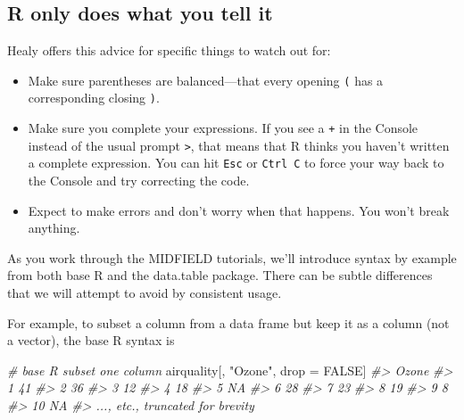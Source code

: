 \documentclass[
]{book}
\newenvironment{Shaded}{\begin{snugshade}}{\end{snugshade}}
\newcommand{\CommentTok}[1]{\textcolor[rgb]{0.56,0.35,0.01}{\textit{#1}}}
\newcommand{\ConstantTok}[1]{\textcolor[rgb]{0.00,0.00,0.00}{#1}}
\newcommand{\NormalTok}[1]{#1}
\newcommand{\OtherTok}[1]{\textcolor[rgb]{0.56,0.35,0.01}{#1}}
\newcommand{\StringTok}[1]{\textcolor[rgb]{0.31,0.60,0.02}{#1}}
\providecommand{\tightlist}{%
  \setlength{\itemsep}{0pt}\setlength{\parskip}{0pt}}
\begin{document}
\hypertarget{r-only-does-what-you-tell-it}{%
\subsection{R only does what you tell it}\label{r-only-does-what-you-tell-it}}

Healy \citeyearpar{Healy:2019} offers this advice for specific things to watch out for:

\begin{itemize}
\tightlist
\item
  Make sure parentheses are balanced---that every opening \texttt{(} has a corresponding closing \texttt{)}.\\
\item
  Make sure you complete your expressions. If you see a \texttt{+} in the Console instead of the usual prompt \texttt{\textgreater{}}, that means that R thinks you haven't written a complete expression. You can hit \texttt{Esc} or \texttt{Ctrl\ C} to force your way back to the Console and try correcting the code.\\
\item
  Expect to make errors and don't worry when that happens. You won't break anything.
\end{itemize}

As you work through the MIDFIELD tutorials, we'll introduce syntax by example from both base R and the data.table package. There can be subtle differences that we will attempt to avoid by consistent usage.

For example, to subset a column from a data frame but keep it as a column (not a vector), the base R syntax is

\begin{Shaded}
\begin{Highlighting}[]
\CommentTok{\# base R subset one column }
\NormalTok{airquality[, }\StringTok{"Ozone"}\NormalTok{, drop }\OtherTok{=} \ConstantTok{FALSE}\NormalTok{]}
\CommentTok{\#\textgreater{}     Ozone}
\CommentTok{\#\textgreater{} 1      41}
\CommentTok{\#\textgreater{} 2      36}
\CommentTok{\#\textgreater{} 3      12}
\CommentTok{\#\textgreater{} 4      18}
\CommentTok{\#\textgreater{} 5      NA}
\CommentTok{\#\textgreater{} 6      28}
\CommentTok{\#\textgreater{} 7      23}
\CommentTok{\#\textgreater{} 8      19}
\CommentTok{\#\textgreater{} 9       8}
\CommentTok{\#\textgreater{} 10     NA}
\CommentTok{\#\textgreater{} ..., etc., truncated for brevity}
\end{Highlighting}
\end{Shaded}
\end{document}
